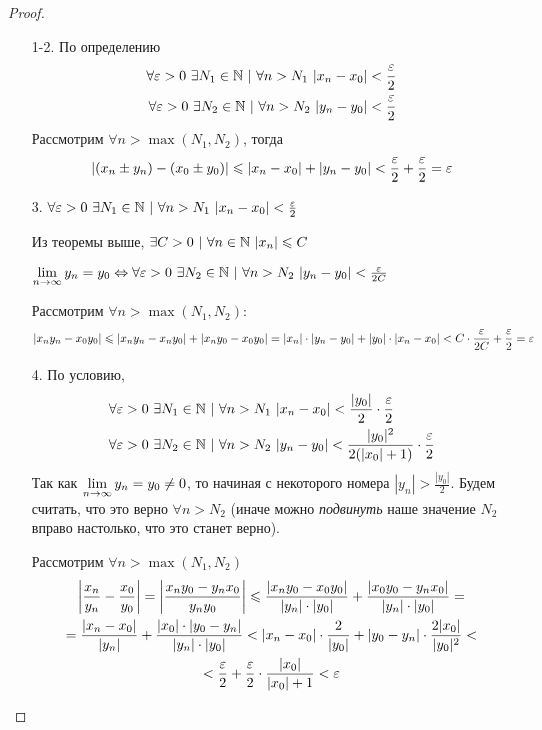 \begin{proof}
\begin{enumerate}
    \item[1-2.] 
    По определению
    \begin{align*}
        \forall \eps > 0\ \exists N_1 \in \N\ |\ \forall n > N_1\ |x_n - x_0| < \frac{\eps}{2}
        \\
        \forall \eps > 0\ \exists N_2 \in \N\ |\ \forall n > N_2\ |y_n - y_0| < \frac{\eps}{2}
    \end{align*}
    Рассмотрим $\forall n > \max(N_1, N_2)$, тогда
    $$
        |(x_n \pm y_n) - (x_0 \pm y_0)| \leqslant |x_n - x_0| + |y_n - y_0| < \frac{\varepsilon}{2} + \frac{\varepsilon}{2} = \varepsilon
    $$
    \item[3.] 
    $\forall \varepsilon > 0\ \exists N_1 \in \mathbb{N}\ |\ \forall n > N_1\ |x_n - x_0| < \frac{\varepsilon}{2}$
    
    Из теоремы выше, $\exists C > 0\ |\ \forall n \in \N\ |x_n| \le C$
    
    $\lim\limits_{n \to \infty} y_n = y_0 \Leftrightarrow \forall \varepsilon > 0\ \exists N_2 \in \mathbb{N}\ |\ \forall n > N_2\ |y_n - y_0| < \frac{\varepsilon}{2C}$
    
    Рассмотрим $\forall n > \max(N_1, N_2)$:
    $$
        |x_n y_n - x_0 y_0| \leqslant |x_n y_n - x_n y_0| + |x_n y_0 - x_0 y_0| = |x_n| \cdot |y_n - y_0| + |y_0| \cdot |x_n - x_0| < C \cdot \frac{\varepsilon}{2C} + \frac{\varepsilon}{2} = \varepsilon
    $$
    \item[4.]
    По условию,
    \begin{align*}
    	&\forall \varepsilon > 0\ \exists N_1 \in \mathbb{N}\ |\ \forall n > N_1\ |x_n - x_0| < \frac{|y_0|}{2} \cdot \frac{\varepsilon}{2}
    	\\
    	&\forall \varepsilon > 0\ \exists N_2 \in \mathbb{N}\ |\ \forall n > N_2\ |y_n - y_0| < \frac{|y_0|^2}{2(|x_0| + 1)} \cdot \frac{\varepsilon}{2}
    \end{align*}
    Так как $\lim\limits_{n \to \infty} y_n = y_0 \neq 0$, то начиная с некоторого номера $|y_n| > \frac{|y_0|}{2}$. Будем считать, что это верно $\forall n > N_2$ (иначе можно \textit{подвинуть} наше значение $N_2$ вправо настолько, что это станет верно).
   	
    Рассмотрим $\forall n > \max(N_1, N_2)$
    \begin{multline*}
        \left|\frac{x_n}{y_n} - \frac{x_0}{y_0}\right| = \left|\frac{x_n y_0 - y_n x_0}{y_n y_0}\right| \leqslant \frac{|x_n y_0 - x_0 y_0|}{|y_n| \cdot |y_0|} + \frac{|x_0 y_0 - y_n x_0|}{|y_n| \cdot |y_0|} =
        \\
        = \frac{|x_n - x_0|}{|y_n|} + \frac{|x_0| \cdot |y_0 - y_n|}{|y_n| \cdot |y_0|} < |x_n - x_0|\cdot \frac{2}{|y_0|} + |y_0 - y_n| \cdot \frac{2|x_0|}{|y_0|^2} <
        \\
        < \frac{\varepsilon}{2} + \frac{\varepsilon}{2} \cdot \frac{|x_0|}{|x_0| + 1} < \varepsilon
    \end{multline*}
\end{enumerate}
\end{proof}

